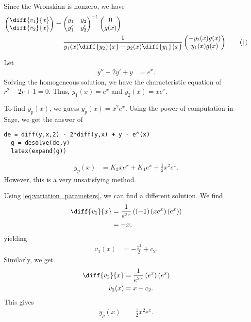 \documentclass[10pt]{mypackage}
\begin{document}
Since the Wronskian is nonzero, we have
\begin{align*}
  \begin{pmatrix}\diff{v_1}{x} \\ \diff{v_2}{x}\end{pmatrix} &= \begin{pmatrix}y_1 & y_2\\y_1' & y_2'\end{pmatrix}^{-1} \begin{pmatrix}0\\g(x)\end{pmatrix}\\
                                                 &= \frac{1}{y_1(x)\diff{y_2}{x} - y_2(x)\diff{y_1}{x}} \begin{pmatrix}-y_2(x)g(x) \\ y_1(x)g(x)\end{pmatrix}\label{eq:variation_parameters}\tag{\textdaggerdbl}
\end{align*}
\begin{example}
  Let
  \begin{align*}
    y'' - 2y' + y &= e^x.
  \end{align*}
  Solving the homogeneous solution, we have the characteristic equation of $r^2 - 2r + 1 = 0$. Thus, $y_1(x) = e^x$ and $y_2(x) = xe^x$.\newline

  To find $y_p(x)$, we guess $y_p(x) = x^2 e^x$. Using the power of computation in Sage, we get the answer of
  \begin{lstlisting}[style=pythonstyle,title=Avoiding Variation of Parameters]
  de = diff(y,x,2) - 2*diff(y,x) + y - e^(x)
  g = desolve(de,y)
  latex(expand(g))
  \end{lstlisting}
  
  \begin{align*}
    y_p(x) &= K_{2} x e^{x}+ K_{1} e^{x} + \frac{1}{2} x^{2} e^{x}.
  \end{align*}
  However, this is a very unsatisfying method.\newline

  Using \eqref{eq:variation_parameters}, we can find a different solution. We find
  \begin{align*}
    \diff{v_1}{x} &= \frac{1}{e^{2x}}\left( \left( -1 \right)\left( xe^{x} \right)\left( e^x \right) \right)\\
            &= -x,
  \end{align*}
  yielding
  \begin{align*}
    v_1(x) &= -\frac{x^2}{2} + c_2.
  \end{align*}
  Similarly, we get
  \begin{align*}
    \diff{v_2}{x} &= \frac{1}{e^{2x}}\left( e^x \right)\left( e^x \right)\\
    v_2(x) &= x + c_2.
  \end{align*}
  This gives
  \begin{align*}
    y_p(x) &= \frac{1}{2}x^2e^x.
  \end{align*}
\end{example}
\end{document}
